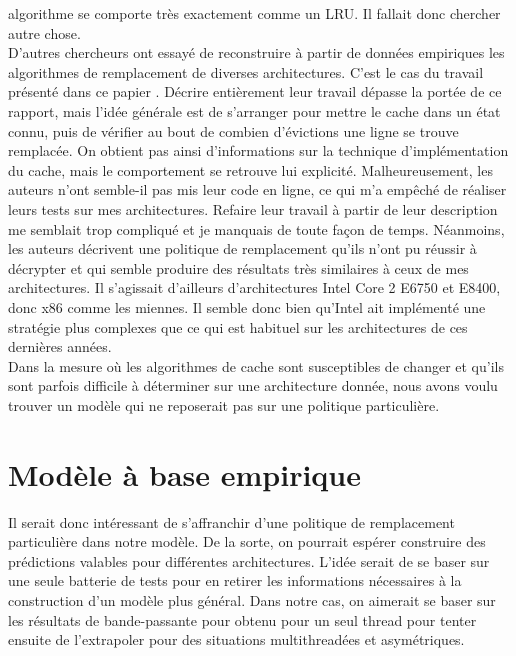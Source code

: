 \documentclass{report}
\begin{document}
algorithme se comporte très exactement comme un LRU. Il fallait donc chercher
autre chose. 
\\D'autres chercheurs ont essayé de reconstruire à partir de données empiriques
les algorithmes de remplacement de diverses architectures. C'est le cas du travail
présenté dans ce papier \cite{cachemodeling}. Décrire entièrement leur travail
dépasse la portée de ce rapport, mais l'idée générale est de s'arranger pour 
mettre le cache dans un état connu, puis de vérifier au bout de combien d'évictions
une ligne se trouve remplacée. On obtient pas ainsi d'informations sur la technique
d'implémentation du cache, mais le comportement se retrouve lui explicité. 
Malheureusement, les auteurs n'ont semble-il pas mis leur code en ligne, ce
qui m'a empêché de réaliser leurs tests sur mes architectures. Refaire leur 
travail à partir de leur description me semblait trop compliqué et je manquais de 
toute façon de temps. Néanmoins, les auteurs décrivent une politique de remplacement
qu'ils n'ont pu réussir à décrypter et qui semble produire des résultats très
similaires à ceux de mes architectures. Il s'agissait d'ailleurs d'architectures
Intel Core 2 E6750 et E8400, donc x86 comme les miennes. Il semble donc bien 
qu'Intel ait implémenté une stratégie plus complexes que ce qui est habituel sur
les architectures de ces dernières années.
\\Dans la mesure où les algorithmes de cache sont susceptibles de changer et qu'ils
sont parfois difficile à déterminer sur une architecture donnée, nous avons
voulu trouver un modèle qui ne reposerait pas sur une politique particulière.

\section{Modèle à base empirique}
Il serait donc intéressant de s'affranchir d'une politique de remplacement
particulière dans notre modèle. De la sorte, on pourrait espérer construire des prédictions
valables pour différentes architectures. L'idée serait de se baser sur une seule batterie
de tests pour en retirer les informations nécessaires à la construction d'un modèle plus
général. Dans notre cas, on aimerait se baser sur les résultats de bande-passante pour
obtenu pour un seul thread pour tenter ensuite de l'extrapoler pour des situations 
multithreadées et asymétriques. 
\end{document}
